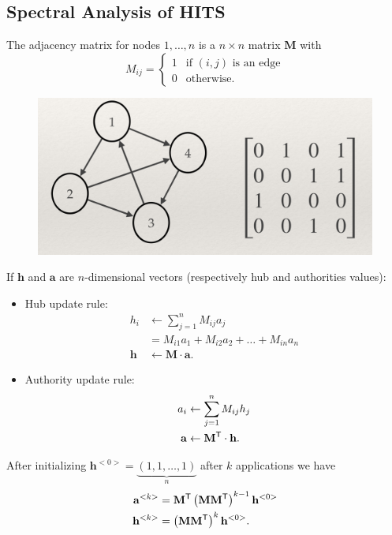 \documentclass[a4paper,9pt]{extarticle}
\begin{document}
\begin{multicols*}{2}
		\subsection{Spectral Analysis of HITS}
		The adjacency matrix for nodes $1,\ldots,n$ is a $n\times n$ matrix $\mathbf{M}$ with
		\begin{equation*}
			M_{ij}=\begin{cases}
				1&\text{if $(i,j)$ is an edge}\\
				0&\text{otherwise}.
			\end{cases}
		\end{equation*}
		\begin{figure}[H]
			\centering
			\includegraphics[width=0.7\linewidth]{screenshot004}
			\label{fig:screenshot004}
		\end{figure}
		If $\mathbf{h}$ and $\mathbf{a}$ are $n$-dimensional vectors (respectively hub and authorities values):
		\begin{itemize}
			\item Hub update rule:
			\begin{align*}
				h_{i}&\leftarrow\sum_{j=1}^{n}M_{ij}a_{j}\\
				&=M_{i1}a_{1}+M_{i2}a_{2}+\ldots+M_{in}a_{n}\\
				\mathbf{h}&\leftarrow\mathbf{M}\cdot\mathbf{a}.
			\end{align*}
			\item Authority update rule:
			\begin{align*}
				a_{i}&\leftarrow\sum_{j=1}^{n}M_{ij}h_{j}\\
				\mathbf{a}&\leftarrow{\mathbf{M}}^{\mathsf{T}}\cdot\mathbf{h}.
			\end{align*}
		\end{itemize}
		After initializing $\mathbf{h}^{<0>}=\underbrace{(1,1,\ldots,1)}_{n}$ after $k$ applications we have
		\begin{align*}
			\mathbf{a}^{<k>}&=\trans{\mathbf{M}}\left(\mathbf{M}\trans{\mathbf{M}}\right)^{k-1}\mathbf{h}^{<0>}\\
			\mathbf{h}^{<k>}&=\left(\mathbf{M}\trans{\mathbf{M}}\right)^{k}\mathbf{h}^{<0>}.

\end{align*}
\end{multicols*}
\end{document}
